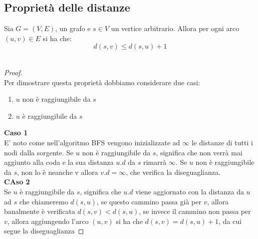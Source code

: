 \subsection{Proprietà delle distanze}
Sia $G = (V, E)$, un grafo e $s \in V$ un vertice arbitrario. Allora per ogni arco $(u,v) \in E$ si ha
che:\\
$$d(s,v) \le d(s,u) + 1$$\\
\begin{proof}
\leavevmode\\
Per dimostrare questa proprietà dobbiamo considerare due casi:
\begin{enumerate}
    \item $u$ non è raggiungibile da $s$
    \item $u$ è raggiungibile da $s$
\end{enumerate}
\noindent \textbf{Caso 1}\\
E’ noto come nell’algoritmo BFS vengono inizializzate ad $\infty$ le distanze di tutti i nodi dalla
sorgente. Se $u$ non è raggiungibile da $s$, significa che non verrà mai aggiunto alla coda e la sua
distanza $u.d$ da $s$ rimarrà $\infty$. Se $u$ non è raggiungibile da $s$, non lo è neanche v allora $v.d =
\infty$, che verifica la diseguaglianza.\\
\textbf{CAso 2}\\
Se $u$ è raggiungibile da $s$, significa che $u.d$ viene aggiornato con la distanza da $u$ ad $s$ che 
chiameremo $d(s, u)$, se questo cammino passa già per $v$, allora banalmente è verificata $d(s,v) < d(s,u)$,
se invece il cammino non passa per $v$, allora aggiungendo l’arco $(u, v)$ si ha che $d(s,v) = d(s,u) + 1$,
da cui segue la diseguaglianza
\end{proof}
